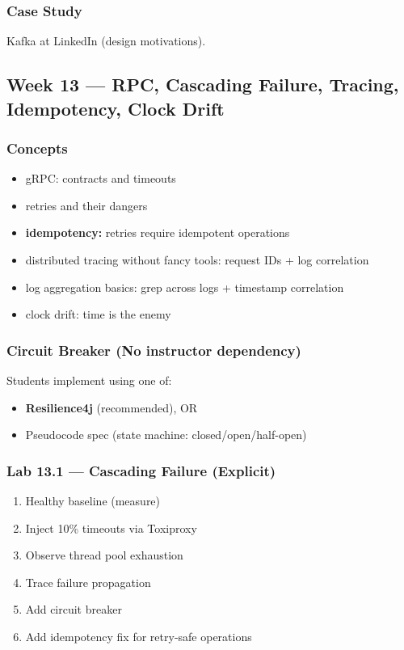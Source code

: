 \documentclass[11pt,a4paper]{article}
\begin{document}
	\subsubsection*{Case Study}
	Kafka at LinkedIn (design motivations).
	
	\subsection*{Week 13 --- RPC, Cascading Failure, Tracing, Idempotency, Clock Drift}
	
	\subsubsection*{Concepts}
	\begin{itemize}[leftmargin=*]
		\item gRPC: contracts and timeouts
		\item retries and their dangers
		\item \textbf{idempotency:} retries require idempotent operations
		\item distributed tracing without fancy tools: request IDs + log correlation
		\item log aggregation basics: grep across logs + timestamp correlation
		\item clock drift: time is the enemy
	\end{itemize}
	
	\subsubsection*{Circuit Breaker (No instructor dependency)}
	Students implement using one of:
	\begin{itemize}[leftmargin=*]
		\item \textbf{Resilience4j} (recommended), OR
		\item Pseudocode spec (state machine: closed/open/half-open)
	\end{itemize}
	
	\subsubsection*{Lab 13.1 --- Cascading Failure (Explicit)}
	\begin{enumerate}[leftmargin=*]
		\item Healthy baseline (measure)
		\item Inject 10\% timeouts via Toxiproxy
		\item Observe thread pool exhaustion
		\item Trace failure propagation
		\item Add circuit breaker
		\item Add idempotency fix for retry-safe operations
	\end{enumerate}
	
\end{document}
